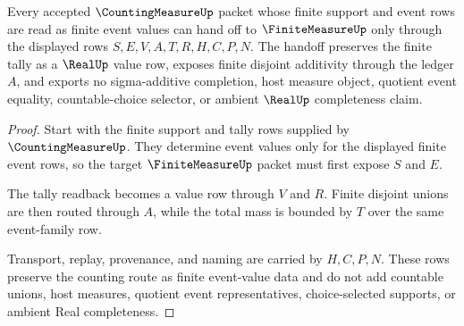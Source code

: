 \begin{theorem}
\label{thm:finite-measure-counting-measure-handoff}
Every accepted $\CountingMeasureUp$ packet whose finite support and event rows are read as finite event values can hand off to $\FiniteMeasureUp$ only through the displayed rows $S,E,V,A,T,R,H,C,P,N$. The handoff preserves the finite tally as a $\RealUp$ value row, exposes finite disjoint additivity through the ledger $A$, and exports no sigma-additive completion, host measure object, quotient event equality, countable-choice selector, or ambient $\RealUp$ completeness claim.
\end{theorem}
\begin{proof}
Start with the finite support and tally rows supplied by $\CountingMeasureUp$. They determine event values only for the displayed finite event rows, so the target $\FiniteMeasureUp$ packet must first expose $S$ and $E$.

The tally readback becomes a value row through $V$ and $R$. Finite disjoint unions are then routed through $A$, while the total mass is bounded by $T$ over the same event-family row.

Transport, replay, provenance, and naming are carried by $H,C,P,N$. These rows preserve the counting route as finite event-value data and do not add countable unions, host measures, quotient event representatives, choice-selected supports, or ambient Real completeness.
\end{proof}


\begin{closurestatus}{\FiniteMeasureUp}
  \theoryclosure{\seedClosure}
  \formalstatus{\unformalizedV}
\end{closurestatus}
